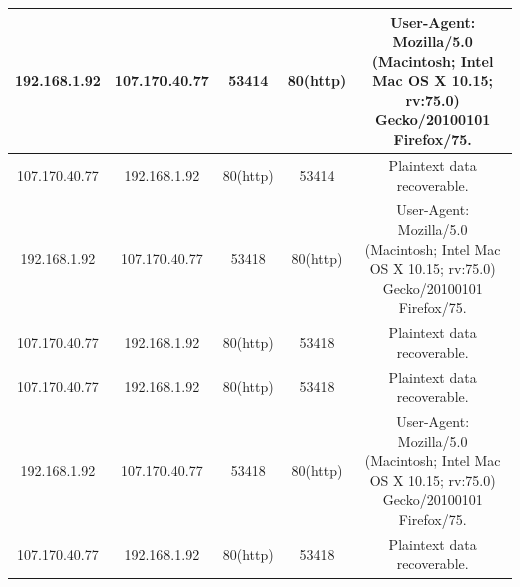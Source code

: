 \documentclass{article}
\begin{document}
\begin{center}
\begin{tabular}{||c c c c c||}
\hline
192.168.1.92 & 107.170.40.77 & 53414 & 80(http) & \multicolumn{1}{m{3cm}|}{User-Agent: Mozilla/5.0 (Macintosh; Intel Mac OS X 10.15; rv:75.0) Gecko/20100101 Firefox/75.}\\
\hline
107.170.40.77 & 192.168.1.92 & 80(http) & 53414 & \multicolumn{1}{m{3cm}|}{Plaintext data recoverable.}\\
\hline
192.168.1.92 & 107.170.40.77 & 53418 & 80(http) & \multicolumn{1}{m{3cm}|}{User-Agent: Mozilla/5.0 (Macintosh; Intel Mac OS X 10.15; rv:75.0) Gecko/20100101 Firefox/75.}\\
\hline
107.170.40.77 & 192.168.1.92 & 80(http) & 53418 & \multicolumn{1}{m{3cm}|}{Plaintext data recoverable.}\\
\hline
107.170.40.77 & 192.168.1.92 & 80(http) & 53418 & \multicolumn{1}{m{3cm}|}{Plaintext data recoverable.}\\
\hline
192.168.1.92 & 107.170.40.77 & 53418 & 80(http) & \multicolumn{1}{m{3cm}|}{User-Agent: Mozilla/5.0 (Macintosh; Intel Mac OS X 10.15; rv:75.0) Gecko/20100101 Firefox/75.}\\
\hline
107.170.40.77 & 192.168.1.92 & 80(http) & 53418 & \multicolumn{1}{m{3cm}|}{Plaintext data recoverable.}\\
\hline
\end{tabular}
\end{center}
\end{document}
